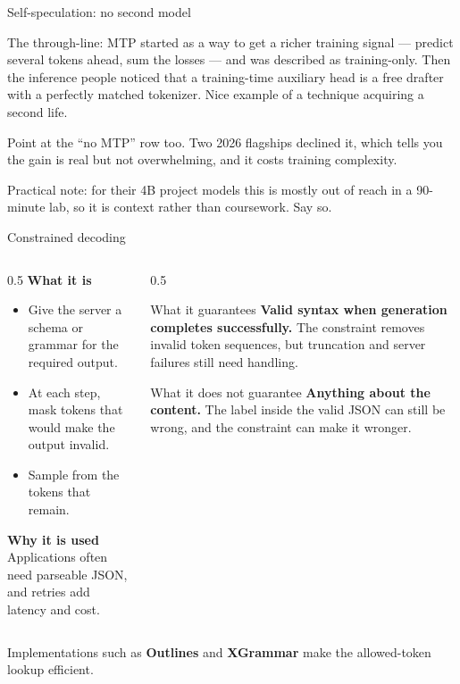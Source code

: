 \documentclass[aspectratio=169,10pt]{beamer}
\begin{document}
\begin{frame}[shrink=3]{Self-speculation: no second model}
{  The through-line: MTP started as a way to get a richer training signal
  --- predict several tokens ahead, sum the losses --- and was described as
  training-only. Then the inference people noticed that a training-time
  auxiliary head is a free drafter with a perfectly matched tokenizer. Nice
  example of a technique acquiring a second life.

  Point at the ``no MTP'' row too. Two 2026 flagships declined it, which tells
  you the gain is real but not overwhelming, and it costs training complexity.

  Practical note: for their 4B project models this is mostly out of reach in a
  90-minute lab, so it is context rather than coursework. Say so.}
\end{frame}
\fi

\begin{frame}{Constrained decoding}
  \begin{columns}[T]
    \begin{column}{0.5\textwidth}
      \textbf{What it is}
      \begin{itemize}
        \item Give the server a schema or grammar for the required output.
        \item At each step, mask tokens that would make the output invalid.
        \item Sample from the tokens that remain.
      \end{itemize}
      \vspace{0.3em}
      \textbf{Why it is used}\\
      Applications often need parseable JSON, and retries add latency and
      cost.
    \end{column}
    \begin{column}{0.5\textwidth}
      \begin{block}{What it guarantees}
        \small
        \textbf{Valid syntax when generation completes successfully.}
        The constraint removes invalid token sequences, but truncation and
        server failures still need handling.
      \end{block}
      \begin{block}{What it does not guarantee}
        \small
        \textbf{Anything about the content.} The label inside the valid JSON
        can still be wrong, and the constraint can make it wronger.
      \end{block}
    \end{column}
  \end{columns}
  \vspace{0.4em}
  Implementations such as \textbf{Outlines} and \textbf{XGrammar} make the
  allowed-token lookup efficient.
\end{frame}
\end{document}
